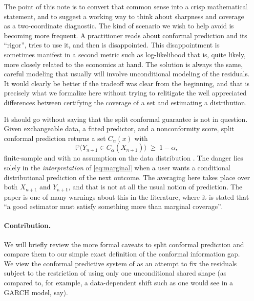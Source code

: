 \documentclass[11pt]{article}
\theoremstyle{definition}
\renewcommand{\Pr}{\mathbb{P}}
\begin{document}
The point of this note is to convert that common sense into a crisp mathematical statement, and to suggest a working way to think about
sharpness and coverage as a two-coordinate diagnostic. The kind of scenario we wish to help avoid is becoming more frequent. A practitioner reads about
conformal prediction and its ``rigor'', tries to use it, and then is disappointed. This disappointment is sometimes manifest in a second metric such
as log-likelihood that is, quite likely, more closely related to the economics at hand. The solution is always the same, careful modeling that usually will
involve unconditional modeling of the residuals. It would clearly be better if the tradeoff was clear from the beginning, and that is precisely what
we formalize here without trying to relitigate the well appreciated differences between certifying the coverage of a set and estimating a distribution. 

It should go without saying that the split conformal guarantee is not in question. Given
exchangeable data, a fitted predictor, and a nonconformity score, split conformal
prediction returns a set $C_\alpha(x)$ with
\begin{equation}\label{eq:marginal}
  \Pr\!\big(Y_{n+1}\in C_\alpha(X_{n+1})\big)\;\ge\;1-\alpha,
\end{equation}
finite-sample and with no assumption on the data distribution
\citep{vovk2005algorithmic,lei2018distribution,angelopoulos2023gentle}. The danger lies solely in the {\em interpretation}
of \eqref{eq:marginal} when a user wants a conditional distributional prediction of the next
outcome. The averaging here takes place over both $X_{n+1}$ and $Y_{n+1}$, and that is not
at all the usual notion of prediction. The paper \citet{lei2014distribution} is one of many
warnings about this in the literature, where it is stated that ``a good estimator must
satisfy something more than marginal coverage''.

\paragraph{Contribution.}
We will briefly review the more formal caveats to split conformal prediction and compare them to our
simple exact definition of the conformal information gap. We view the conformal predictive system of 
\citet{vovk2019nonparametric} as an attempt to fix the residuals subject to the restriction of using only one 
unconditional shared shape (as compared to, for example, a data-dependent shift such as one would see in a GARCH
model, say). 
\end{document}
